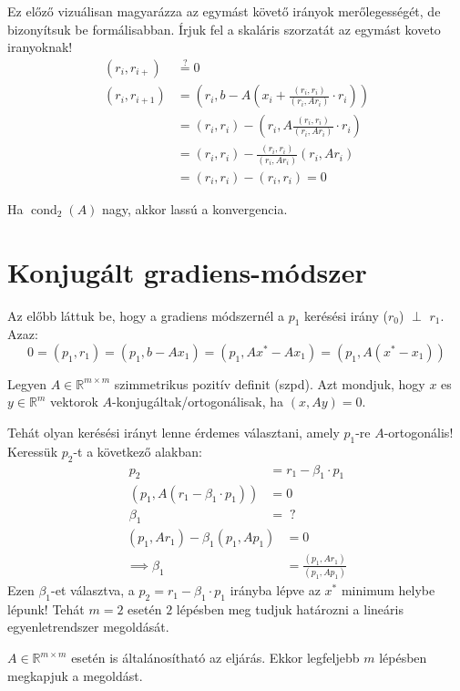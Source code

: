 Ez előző vizuálisan magyarázza az egymást követő irányok merőlegességét, de bizonyítsuk be formálisabban. Írjuk fel a skaláris szorzatát az egymást koveto iranyoknak!
\begin{align*}
    (r_{i}, r_{i+}) & \stackrel{?}{=} 0 \\
    (r_{i}, r_{i+1}) & = \left( r_{i}, b - A\left( x_{i} + \frac{(r_{i}, r_{i})}{(r_{i}, Ar_{i})} \cdot r_{i}\right) \right) \\
    & = (r_{i}, r_{i}) - (r_{i}, A\frac{(r_{i}, r_{i})}{(r_{i}, Ar_{i})} \cdot r_{i}) \\
    & = (r_{i}, r_{i}) - \frac{(r_{i}, r_{i})}{(r_{i}, Ar_{i})}(r_{i}, Ar_{i}) \\
    & = (r_{i}, r_{i}) - (r_{i}, r_{i}) = 0
\end{align*}

\begin{megj}
    Ha $\operatorname{cond}_{2}(A)$ nagy, akkor lassú a konvergencia.
\end{megj}


\section{Konjugált gradiens-módszer}

Az előbb láttuk be, hogy a gradiens módszernél a $p_{1}$ kerésési irány ($r_{0}$) $\perp$ $r_{1}$.
Azaz:
$$
0 = (p_{1}, r_{1}) = (p_{1}, b - Ax_{1}) = (p_{1}, Ax^{*} - Ax_{1}) = (p_{1}, A(x^{*} - x_{1}))
$$

\begin{definition}
    Legyen $A \in \mathbb{R}^{m \times m}$ szimmetrikus pozitív definit (szpd). Azt mondjuk, hogy $x$ es $y \in \mathbb{R}^{m}$ vektorok $A$-konjugáltak/ortogonálisak, ha $(x, Ay) = 0$.
\end{definition}

Tehát olyan kerésési irányt lenne érdemes választani, amely $p_{1}$-re $A$-ortogonális! \\
Keressük $p_{2}$-t a következő alakban:
\begin{align*}
    p_{2} & = r_{1} - \beta_{1} \cdot p_{1} \\
    (p_{1}, A(r_{1}-\beta_{1}\cdot p_{1})) & = 0 \\
    \beta_{1} & = \; ?  
\end{align*}
\begin{align*}
    (p_{1}, Ar_{1}) - \beta_{1} (p_{1}, Ap_{1}) & = 0 \\
    \implies \beta_{1} & = \frac{(p_{1}, Ar_{1})}{(p_{1}, Ap_{1})}
\end{align*}
Ezen $\beta_{1}$-et választva, a $p_{2} = r_{1} - \beta_{1} \cdot p_{1}$ irányba lépve az $x^{*}$ minimum helybe lépunk! Tehát $m = 2$ esetén $2$ lépésben meg tudjuk határozni a lineáris egyenletrendszer megoldását.

\begin{megj}
    $A \in \mathbb{R}^{m \times m}$ esetén is általánosítható az eljárás. Ekkor legfeljebb $m$ lépésben megkapjuk a megoldást.
\end{megj}





